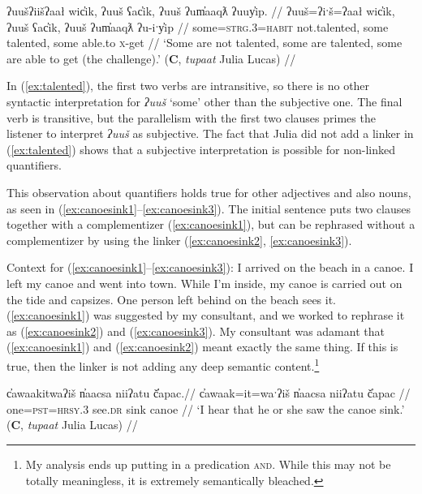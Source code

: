 \ex \label{ex:talented}
\begingl
\glpreamble ʔuušʔiišʔaał wic̓ik, ʔuuš ʕac̓ik, ʔuuš ʔum̓aaqƛ ʔuuy̓ip. //
\gla ʔuuš=ʔiˑš=ʔaał wic̓ik, ʔuuš ʕac̓ik, ʔuuš ʔum̓aaqƛ ʔu-iˑy̓ip //
\glb some=\textsc{strg.3}=\textsc{habit} not.talented, some talented, some able.to \textsc{x}-get //
\glft ‘Some are not talented, some are talented, some are able to get (the challenge).’ (\textbf{C}, \textit{tupaat} Julia Lucas) //
\endgl
\xe

In (\ref{ex:talented}), the first two verbs are intransitive, so there is no other syntactic interpretation for \textit{ʔuuš} `some' other than the subjective one. The final verb is transitive, but the parallelism with the first two clauses primes the listener to interpret \textit{ʔuuš} as subjective. The fact that Julia did not add a linker in (\ref{ex:talented}) shows that a subjective interpretation is possible for non-linked quantifiers. %

This observation about quantifiers holds true for other adjectives and also nouns, as seen in (\ref{ex:canoesink1}--\ref{ex:canoesink3}). The initial sentence puts two clauses together with a complementizer (\ref{ex:canoesink1}), but can be rephrased without a complementizer by using the linker (\ref{ex:canoesink2}, \ref{ex:canoesink3}).

\vspace{5pt}

\noindent Context for (\ref{ex:canoesink1}--\ref{ex:canoesink3}): I arrived on the beach in a canoe. I left my canoe and went into town. While I'm inside, my canoe is carried out on the tide and capsizes. One person left behind on the beach sees it. (\ref{ex:canoesink1}) was suggested by my consultant, and we worked to rephrase it as (\ref{ex:canoesink2}) and (\ref{ex:canoesink3}). My consultant was adamant that (\ref{ex:canoesink1}) and (\ref{ex:canoesink2}) meant exactly the same thing. If this is true, then the linker is not adding any deep semantic content.\footnote{My analysis ends up putting in a predication \textsc{and}. While this may not be totally meaningless, it is extremely semantically bleached.}

\ex \label{ex:canoesink1}
\begingl
\glpreamble c̓awaakitwaʔiš n̓aacsa niiʔatu č̓apac.//
\gla c̓awaak=it=waˑʔiš n̓aacsa niiʔatu č̓apac //
\glb one=\textsc{pst}=\textsc{hrsy.3} see.\textsc{dr} sink canoe //
\glft `I hear that he or she saw the canoe sink.' (\textbf{C}, \textit{tupaat} Julia Lucas) //
\endgl
\xe

